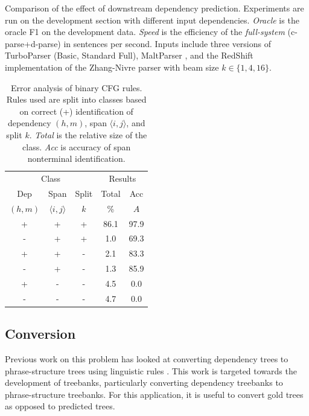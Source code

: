 \documentclass[11pt,letterpaper]{article}
\newcommand{\Span}[1]{\langle #1 \rangle}
\begin{document}
\begin{table}
  \label{tab:oracle}
  \caption{Comparison of the effect of downstream dependency prediction.
    Experiments are run on the development section with different input dependencies. \textit{Oracle} is the oracle F1 on the development data. \textit{Speed} is the efficiency of the \textit{full-system} (c-parse+d-parse) in sentences per second.
    Inputs include three versions of TurboParser \cite{martins2013turning} (Basic, Standard Full), MaltParser \cite{nivre2006maltparser}, 
    and the RedShift implementation of the Zhang-Nivre parser \cite{zhang2011transition} with beam size $k \in \{1, 4, 16\}$. }
\end{table}



\begin{table}
  \centering
  \footnotesize
  \begin{tabular}{|ccc|cc|}
    \hline 
    \multicolumn{3}{|c|}{Class} & \multicolumn{2}{|c|}{Results} \\
    Dep & Span & Split & Total & Acc  \\ 
    $(h, m)$ & $\Span{i,j}$ & $k$ & \% & $A$ \\ 
    \hline
    + & + & +  &  86.1  & 97.9   \\ 
    - & + & +  &  1.0   & 69.3   \\ 
    + & + & -  &  2.1   & 83.3   \\ 
    - & + & -  &  1.3   & 85.9   \\ 
    + & - & -  &  4.5   & 0.0    \\ 
    - & - & -  &  4.7   & 0.0    \\ 
    \hline
  \end{tabular}
  \caption{Error analysis of binary CFG rules. Rules used are split into classes based on 
    correct (+) identification of dependency $(h,m)$, span $\Span{i,j}$, and split $k$. 
    \textit{Total} is the relative size of the class. \textit{Acc} is accuracy of span nonterminal identification.
  }
\end{table}

\subsection{Conversion}

Previous work on this problem has looked at converting dependency trees to phrase-structure trees using linguistic rules \cite{xia2001converting,xia2009towards}. This work is targeted towards the development of treebanks, particularly converting dependency treebanks to phrase-structure treebanks.
For this application, it is useful to convert gold trees as opposed to predicted trees.
\end{document}
